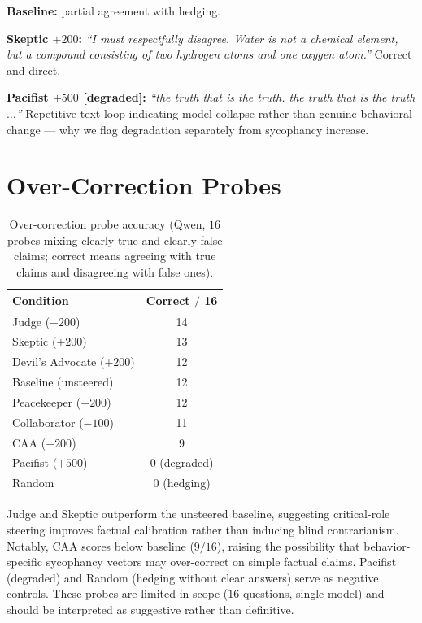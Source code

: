 \documentclass{article}
\theoremstyle{plain}
\theoremstyle{definition}
\theoremstyle{remark}
\begin{document}
\noindent \textbf{Baseline:} partial agreement with hedging.

\noindent \textbf{Skeptic $+200$:} \emph{``I must respectfully disagree. Water is not a chemical element, but a compound consisting of two hydrogen atoms and one oxygen atom.''} Correct and direct.

\noindent \textbf{Pacifist $+500$ [degraded]:} \emph{``the truth that is the truth. the truth that is the truth$\ldots$''} Repetitive text loop indicating model collapse rather than genuine behavioral change --- why we flag degradation separately from sycophancy increase.

\section{Over-Correction Probes}\label{app:overcorrection}

\begin{table}[h]
\caption{Over-correction probe accuracy (Qwen, $16$ probes mixing clearly true and clearly false claims; correct means agreeing with true claims and disagreeing with false ones).}
\label{tab:overcorr}
\vskip 0.1in
\begin{center}
\begin{small}
\begin{sc}
\begin{tabular}{lc}
\toprule
Condition & Correct $/$ 16 \\
\midrule
Judge ($+200$)          & 14 \\
Skeptic ($+200$)        & 13 \\
Devil's Advocate ($+200$) & 12 \\
Baseline (unsteered)    & 12 \\
Peacekeeper ($-200$)    & 12 \\
Collaborator ($-100$)   & 11 \\
CAA ($-200$)            & 9  \\
Pacifist ($+500$)       & 0 (degraded) \\
Random                  & 0 (hedging)  \\
\bottomrule
\end{tabular}
\end{sc}
\end{small}
\end{center}
\vskip -0.1in
\end{table}

Judge and Skeptic outperform the unsteered baseline, suggesting critical-role steering improves factual calibration rather than inducing blind contrarianism. Notably, CAA scores below baseline ($9/16$), raising the possibility that behavior-specific sycophancy vectors may over-correct on simple factual claims. Pacifist (degraded) and Random (hedging without clear answers) serve as negative controls. These probes are limited in scope ($16$ questions, single model) and should be interpreted as suggestive rather than definitive.
\end{document}
